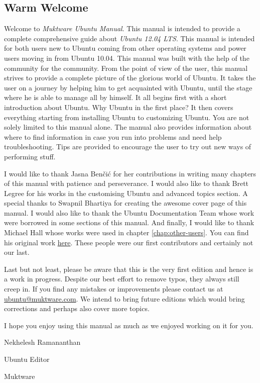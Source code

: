 \subsection*{Warm Welcome}

\vspace{0.5cm}

Welcome to \emph{Muktware Ubuntu Manual}. This manual is intended to provide a complete comprehensive guide about \emph{Ubuntu 12.04 LTS}. This manual is intended for both users new to Ubuntu coming from other operating systems and power users moving in from Ubuntu 10.04.  This manual was built with the help of the community for the community. From the point of view of the user, this manual strives to provide a complete picture of the glorious world of Ubuntu. It takes the user on a journey by helping him to get acquainted with Ubuntu, until the stage where he is able to manage all by himself. It all begins first with a short introduction about Ubuntu. Why Ubuntu in the first place? It then covers everything starting from installing Ubuntu to customizing Ubuntu. You are not solely limited to this manual alone. The manual also provides information about where to find information in case you run into problems and need help troubleshooting. Tips are provided to encourage the user to try out new ways of performing stuff. \\

\vspace{0.3cm}

\par \noindent I would like to thank Jasna Ben\v{c}i\'{c} for her contributions in writing many chapters of this manual with patience and perseverance. I would also like to thank Brett Legree for his works in the customising Ubuntu and advanced topics section. A special thanks to Swapnil Bhartiya for creating the awesome cover page of this manual. I would also like to thank the Ubuntu Documentation Team whose work were borrowed in some sections of this manual. And finally, I would like to thank Michael Hall whose works were used in chapter \ref{chap:other-users}. You can find his original work \href{http://mhall119.com/2012/04/so-you-want-to-try-switching-to-ubuntu/}{here}. These people were our first contributors and certainly not our last. \\

\vspace{0.3cm}

\par \noindent  Last but not least, please be aware that this is the very first edition and hence is a work in progress. Despite our best effort to remove typos, they always still creep in. If you find any mistakes or improvements please contact us at \href{mailto:ubuntu@muktware.com}{ubuntu@muktware.com}. We intend to bring future editions which would bring corrections and perhaps also cover more topics.\\

\vspace{0.3cm}

\par \noindent I hope you enjoy using this manual as much as we enjoyed working on it for you. \\

\vspace{0.7cm}

\par \noindent Nekhelesh Ramananthan 
\par \noindent Ubuntu Editor 
\par \noindent Muktware
